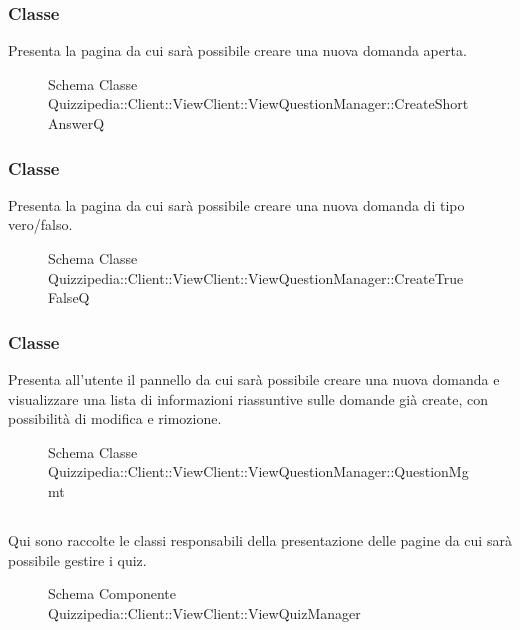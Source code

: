 \subsubsection{Classe }
Presenta la pagina da cui sarà possibile creare una nuova domanda aperta.
\begin{figure}[H]
\centering
\noindent{}
\caption[Schema Classe CreateShortAnswerQ]{Schema Classe Quizzipedia::Client::ViewClient::ViewQuestionManager::CreateShortAnswerQ}
\end{figure}
\subsubsection{Classe }
Presenta la pagina da cui sarà possibile creare una nuova domanda di tipo vero/falso.
\begin{figure}[H]
\centering
\noindent{}
\caption[Schema Classe CreateTrueFalseQ]{Schema Classe Quizzipedia::Client::ViewClient::ViewQuestionManager::CreateTrueFalseQ}
\end{figure}
\subsubsection{Classe }
Presenta all'utente il pannello da cui sarà possibile creare una nuova domanda e visualizzare una lista di informazioni riassuntive sulle domande già create, con possibilità di modifica e rimozione.
\begin{figure}[H]
\centering
\noindent{}
\caption[Schema Classe QuestionMgmt]{Schema Classe Quizzipedia::Client::ViewClient::ViewQuestionManager::QuestionMgmt}
\end{figure}
\subsection{}
Qui sono raccolte le classi responsabili della presentazione delle pagine da cui sarà possibile gestire i quiz.
\begin{figure}[H]
\centering
\noindent{}
\caption[Schema Componente Quizzipedia::Client::ViewClient::ViewQuizManager]{Schema Componente Quizzipedia::Client::ViewClient::ViewQuizManager}
\end{figure}
